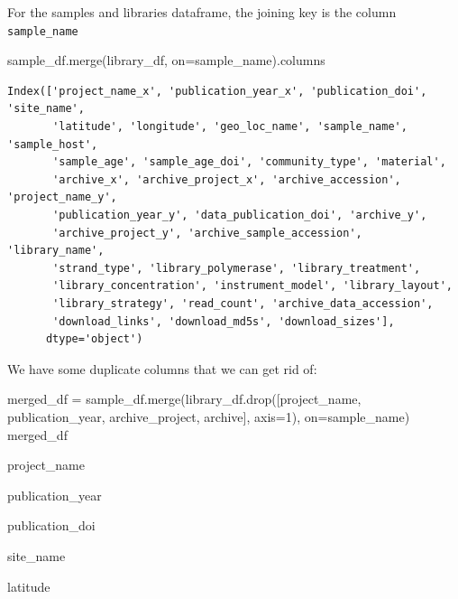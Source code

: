 \documentclass[
  letterpaper,
]{book}
\newenvironment{Shaded}{}{}
\newcommand{\DecValTok}[1]{\textcolor[rgb]{0.00,0.36,0.77}{#1}}
\newcommand{\NormalTok}[1]{\textcolor[rgb]{0.14,0.16,0.18}{#1}}
\newcommand{\OperatorTok}[1]{\textcolor[rgb]{0.14,0.16,0.18}{#1}}
\newcommand{\StringTok}[1]{\textcolor[rgb]{0.01,0.18,0.38}{#1}}
\begin{document}
For the samples and libraries dataframe, the joining key is the column
\texttt{sample\_name}

\begin{Shaded}
\begin{Highlighting}[]
\NormalTok{sample\_df.merge(library\_df, on}\OperatorTok{=}\StringTok{\textquotesingle{}sample\_name\textquotesingle{}}\NormalTok{).columns}
\end{Highlighting}
\end{Shaded}

\begin{verbatim}
Index(['project_name_x', 'publication_year_x', 'publication_doi', 'site_name',
       'latitude', 'longitude', 'geo_loc_name', 'sample_name', 'sample_host',
       'sample_age', 'sample_age_doi', 'community_type', 'material',
       'archive_x', 'archive_project_x', 'archive_accession', 'project_name_y',
       'publication_year_y', 'data_publication_doi', 'archive_y',
       'archive_project_y', 'archive_sample_accession', 'library_name',
       'strand_type', 'library_polymerase', 'library_treatment',
       'library_concentration', 'instrument_model', 'library_layout',
       'library_strategy', 'read_count', 'archive_data_accession',
       'download_links', 'download_md5s', 'download_sizes'],
      dtype='object')
\end{verbatim}

We have some duplicate columns that we can get rid of:

\begin{Shaded}
\begin{Highlighting}[]
\NormalTok{merged\_df }\OperatorTok{=}\NormalTok{ sample\_df.merge(library\_df.drop([}\StringTok{\textquotesingle{}project\_name\textquotesingle{}}\NormalTok{, }\StringTok{\textquotesingle{}publication\_year\textquotesingle{}}\NormalTok{, }\StringTok{\textquotesingle{}archive\_project\textquotesingle{}}\NormalTok{, }\StringTok{\textquotesingle{}archive\textquotesingle{}}\NormalTok{], axis}\OperatorTok{=}\DecValTok{1}\NormalTok{), on}\OperatorTok{=}\StringTok{\textquotesingle{}sample\_name\textquotesingle{}}\NormalTok{)}
\NormalTok{merged\_df}
\end{Highlighting}
\end{Shaded}

project\_name

publication\_year

publication\_doi

site\_name

latitude
\end{document}
